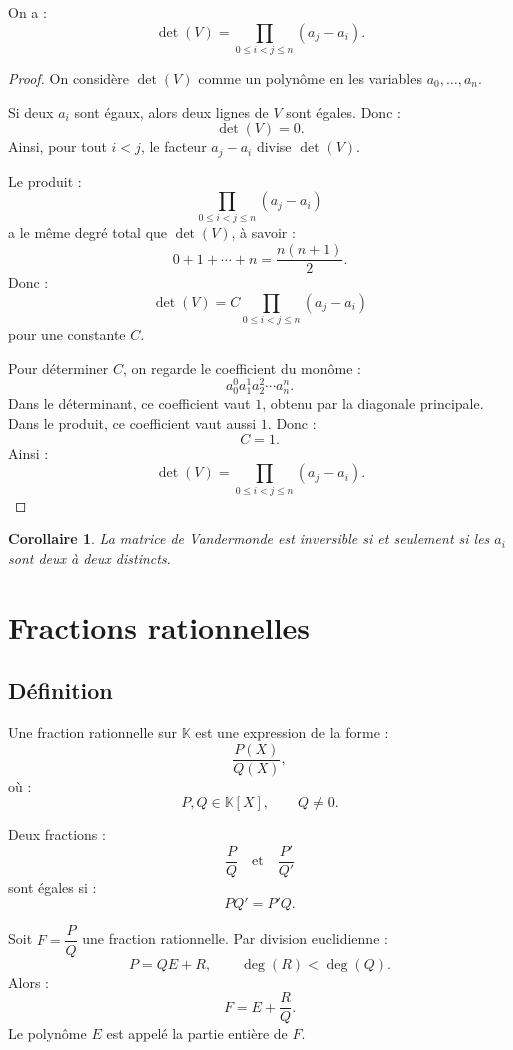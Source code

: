 \documentclass[11pt,a4paper]{article}
\newcommand{\K}{\mathbb K}
\newtheorem{corollaire}[prop]{Corollaire}
\begin{document}
\begin{theorembox}
On a :
\[
\det(V)=\prod_{0\leq i<j\leq n}(a_j-a_i).
\]
\end{theorembox}

\begin{proof}
On considère \(\det(V)\) comme un polynôme en les variables \(a_0,\dots,a_n\).

Si deux \(a_i\) sont égaux, alors deux lignes de \(V\) sont égales.  
Donc :
\[
\det(V)=0.
\]
Ainsi, pour tout \(i<j\), le facteur \(a_j-a_i\) divise \(\det(V)\).

Le produit :
\[
\prod_{0\leq i<j\leq n}(a_j-a_i)
\]
a le même degré total que \(\det(V)\), à savoir :
\[
0+1+\cdots+n=\frac{n(n+1)}2.
\]
Donc :
\[
\det(V)=C\prod_{0\leq i<j\leq n}(a_j-a_i)
\]
pour une constante \(C\).

Pour déterminer \(C\), on regarde le coefficient du monôme :
\[
a_0^0a_1^1a_2^2\cdots a_n^n.
\]
Dans le déterminant, ce coefficient vaut \(1\), obtenu par la diagonale principale.  
Dans le produit, ce coefficient vaut aussi \(1\).  
Donc :
\[
C=1.
\]
Ainsi :
\[
\det(V)=\prod_{0\leq i<j\leq n}(a_j-a_i).
\]
\end{proof}

\begin{corollaire}
La matrice de Vandermonde est inversible si et seulement si les \(a_i\) sont deux à deux distincts.
\end{corollaire}

\section{Fractions rationnelles}

\subsection{Définition}

\begin{definitionbox}
Une fraction rationnelle sur \(\K\) est une expression de la forme :
\[
\frac{P(X)}{Q(X)},
\]
où :
\[
P,Q\in\K[X],
\qquad
Q\neq0.
\]
\end{definitionbox}

Deux fractions :
\[
\frac{P}{Q}
\quad\text{et}\quad
\frac{P'}{Q'}
\]
sont égales si :
\[
PQ'=P'Q.
\]

\begin{definitionbox}
Soit \(F=\dfrac{P}{Q}\) une fraction rationnelle.  
Par division euclidienne :
\[
P=QE+R,
\qquad
\deg(R)<\deg(Q).
\]
Alors :
\[
F=E+\frac{R}{Q}.
\]
Le polynôme \(E\) est appelé la partie entière de \(F\).
\end{definitionbox}
\end{document}
